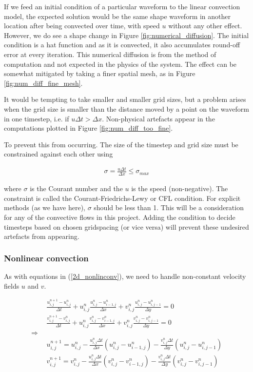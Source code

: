 \documentclass[11pt]{article}
\begin{document}
{If we feed an initial condition of a particular waveform to the linear convection model,
the expected solution would be the same shape waveform in another location after being
convected over time, with speed $u$ without any other effect. However, we do see a shape
change in Figure \ref{fig:numerical_diffusion}. The initial condition is a hat function
and as it is convected, it also accumulates round-off error at every iteration. This
numerical diffusion is from the method of computation and not expected in the physics
of the system. The effect can be somewhat mitigated by taking a finer spatial mesh,
as in Figure \ref{fig:num_diff_fine_mesh}.

It would be tempting to take smaller and smaller grid sizes, but a problem arises when
the grid size is smaller than the distance moved by a point on the waveform in one
timestep, i.e. if $u\Delta t > \Delta x$. Non-physical artefacts appear in the computations
plotted in Figure \ref{fig:num_diff_too_fine}.

To prevent this from occurring. The size of the timestep and grid size must be constrained
against each other using

\begin{align}
\sigma = \frac{u \Delta t}{\Delta x} \leq \sigma_{max}
\end{align}

where $\sigma$ is the Courant number and the $u$ is the speed (non-negative).
The constraint is called the Courant-Friedrichs-Lewy or CFL condition.
For explicit methods (as we have here), $\sigma$ should be less than 1.
This will be a consideration for any of the convective flows in this project.
Adding the condition to decide timesteps based on chosen gridspacing (or vice versa)
will prevent these undesired artefacts from appearing.

\subsubsection{Nonlinear convection}
As with equations in (\ref{2d_nonlinconv}), we need to handle non-constant velocity
fields $u$ and $v$.

\begin{align}
&\frac{u^{n+1}_{i,j} - u^{n}_{i,j}}{\Delta t}
	+ u^n_{i,j} \frac{u^{n}_{i,j} - u^{n}_{i-1,j}}{\Delta x}
	+ v^n_{i,j} \frac{u^{n}_{i,j} - u^{n}_{i,j-1}}{\Delta y} = 0	\nonumber \\
&\frac{v^{n+1}_{i,j} - v^{n}_{i,j}}{\Delta t}
	+ u^n_{i,j} \frac{v^{n}_{i,j} - v^{n}_{i-1,j}}{\Delta x}
	+ v^n_{i,j} \frac{v^{n}_{i,j} - v^{n}_{i,j-1}}{\Delta y} = 0 \\
\Rightarrow ~~ \nonumber \\
&u^{n+1}_{i,j} = u^n_{i,j}
				- \frac{u^n_{i,j} \Delta t}{\Delta x}(u^n_{i,j} - u^n_{i-1,j})
				- \frac{v^n_{i,j} \Delta t}{\Delta y}(u^n_{i,j} - u^n_{i,j-1})
																 \nonumber \\
&v^{n+1}_{i,j} = v^n_{i,j}
				- \frac{u^n_{i,j} \Delta t}{\Delta x}(v^n_{i,j} - v^n_{i-1,j})
				- \frac{v^n_{i,j} \Delta t}{\Delta y}(v^n_{i,j} - v^n_{i,j-1})
\end{align}

}
\end{document}
